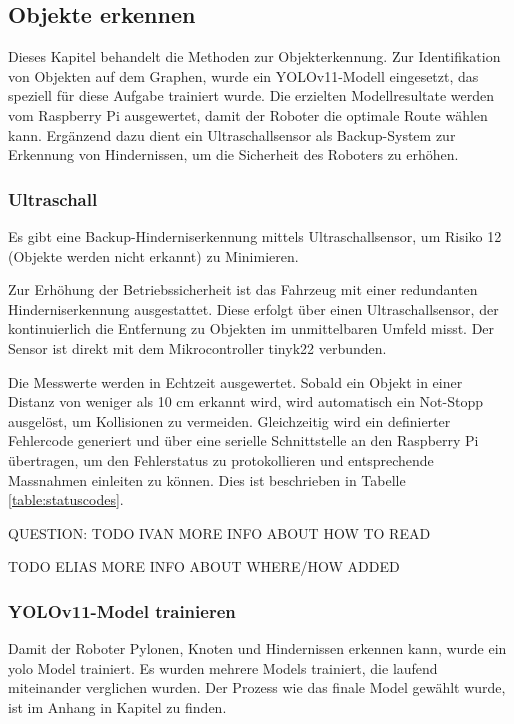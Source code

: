 
\subsection{Objekte erkennen}

Dieses Kapitel behandelt die Methoden zur Objekterkennung. Zur Identifikation von Objekten auf dem Graphen, wurde ein YOLOv11-Modell eingesetzt, das speziell für diese Aufgabe trainiert wurde. Die erzielten Modellresultate werden vom Raspberry Pi ausgewertet, damit der Roboter die optimale Route wählen kann. Ergänzend dazu dient ein Ultraschallsensor als Backup-System zur Erkennung von Hindernissen, um die Sicherheit des Roboters zu erhöhen. 


\subsubsection{Ultraschall}
\label{ultraschall}

Es gibt eine Backup-Hinderniserkennung mittels Ultraschallsensor, um Risiko 12 (Objekte werden nicht erkannt) zu Minimieren.

Zur Erhöhung der Betriebssicherheit ist das Fahrzeug mit einer redundanten Hinderniserkennung ausgestattet. Diese erfolgt über einen Ultraschallsensor, der kontinuierlich die Entfernung zu Objekten im unmittelbaren Umfeld misst. Der Sensor ist direkt mit dem Mikrocontroller \gls{tinyk22} verbunden.

Die Messwerte werden in Echtzeit ausgewertet. Sobald ein Objekt in einer Distanz von weniger als 10 cm erkannt wird, wird automatisch ein Not-Stopp ausgelöst, um Kollisionen zu vermeiden. Gleichzeitig wird ein definierter Fehlercode generiert und über eine serielle Schnittstelle an den Raspberry Pi übertragen, um den Fehlerstatus zu protokollieren und entsprechende Massnahmen einleiten zu können. Dies ist beschrieben in Tabelle \ref{table:statuscodes}.


QUESTION: TODO IVAN MORE INFO ABOUT HOW TO READ 

TODO ELIAS MORE INFO ABOUT WHERE/HOW ADDED 




\subsubsection{YOLOv11-Model trainieren}

Damit der Roboter Pylonen, Knoten und Hindernissen erkennen kann, wurde ein \gls{yolo} Model trainiert.
Es wurden mehrere Models trainiert, die laufend miteinander verglichen wurden. Der Prozess wie das finale Model gewählt wurde, ist im Anhang in Kapitel  zu finden.

